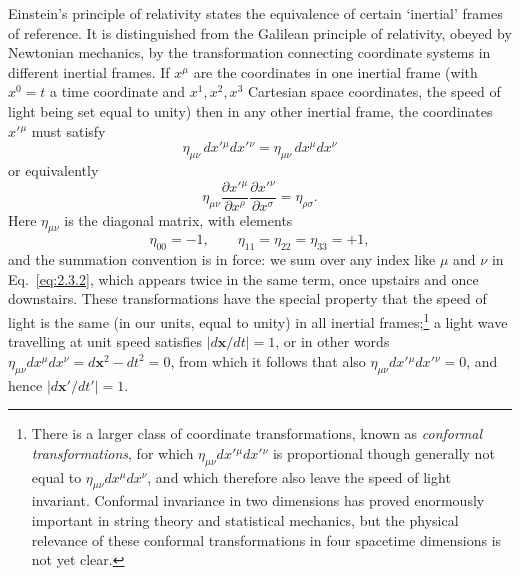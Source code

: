Einstein's principle of relativity states the equivalence of certain
`inertial' frames of reference. It is distinguished from the Galilean
principle of relativity, obeyed by Newtonian mechanics, by the
transformation connecting coordinate systems in different inertial frames.
If $x^\mu$ are the coordinates in one inertial frame (with $x^0=t$ a time
coordinate and $x^1,x^2,x^3$ Cartesian space coordinates, the speed of
light being set equal to unity) then in any other inertial frame, the
coordinates $x'{}^\mu$ must satisfy
\begin{equation}
  \eta_{\mu\nu}\,dx'{}^\mu dx'{}^\nu
    =\eta_{\mu\nu}\,dx^\mu dx^\nu
  \tag{2.3.1}\label{eq:2.3.1}
\end{equation}
or equivalently
\begin{equation}
  \eta_{\mu\nu}
    \frac{\partial x'{}^\mu}{\partial x^\rho}
    \frac{\partial x'{}^\nu}{\partial x^\sigma}
    =\eta_{\rho\sigma}.
  \tag{2.3.2}\label{eq:2.3.2}
\end{equation}
Here $\eta_{\mu\nu}$ is the diagonal matrix, with elements
\begin{equation}
  \eta_{00}=-1,
  \qquad \eta_{11}=\eta_{22}=\eta_{33}=+1,
  \tag{2.3.3}\label{eq:2.3.3}
\end{equation}
and the summation convention is in force: we sum over any index like
$\mu$ and $\nu$ in Eq.~\eqref{eq:2.3.2}, which appears twice in the same term, once
upstairs and once downstairs. These transformations have the special
property that the speed of light is the same (in our units, equal to unity)
in all inertial frames;\footnote{There is a larger class of coordinate
transformations, known as \emph{conformal transformations}, for which
$\eta_{\mu\nu}dx'{}^\mu dx'{}^\nu$ is proportional though generally not
equal to $\eta_{\mu\nu}dx^\mu dx^\nu$, and which therefore also leave the
speed of light invariant. Conformal invariance in two dimensions has
proved enormously important in string theory and statistical mechanics,
but the physical relevance of these conformal transformations in four
spacetime dimensions is not yet clear.}
a light wave travelling at unit
speed satisfies $|d\mathbf{x}/dt|=1$, or in other words
$\eta_{\mu\nu}dx^\mu dx^\nu=d\mathbf{x}^2-dt^2=0$, from which it follows
that also $\eta_{\mu\nu}dx'{}^\mu dx'{}^\nu=0$, and hence
$|d\mathbf{x}'/dt'|=1$.

